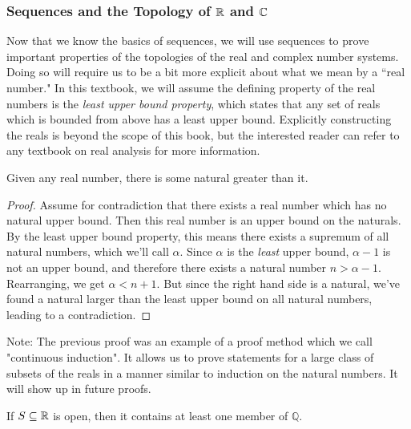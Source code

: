 \subsubsection{Sequences and the Topology of $\mathbb{R}$ and $\mathbb{C}$}
Now that we know the basics of sequences, we will use sequences to prove important properties of the topologies of the real and complex number systems. Doing so will require us to be a bit more explicit about what we mean by a ``real number." In this textbook, we will assume the defining property of the real numbers is the \emph{least upper bound property}, which states that any set of reals which is bounded from above has a least upper bound. Explicitly constructing the reals is beyond the scope of this book, but the interested reader can refer to any textbook on real analysis for more information.
\begin{lemma}
Given any real number, there is some natural greater than it.
\end{lemma}
\begin{proof}
Assume for contradiction that there exists a real number which has no natural upper bound. Then this real number is an upper bound on the naturals. By the least upper bound property, this means there exists a supremum of all natural numbers, which we'll call $\alpha$. Since $\alpha$ is the \emph{least} upper bound, $\alpha -1$ is not an upper bound, and therefore there exists a natural number $n > \alpha -1$. Rearranging, we get $\alpha < n+1$. But since the right hand side is a natural, we've found a natural larger than the least upper bound on all natural numbers, leading to a contradiction.
\end{proof}
Note: The previous proof was an example of a proof method which we call "continuous induction". It allows us to prove statements for a large class of subsets of the reals in a manner similar to induction on the natural numbers. It will show up in future proofs.
\begin{theorem}
If $S \subseteq \mathbb{R}$ is open, then it contains at least one member of $\mathbb{Q}$.
\end{theorem}
